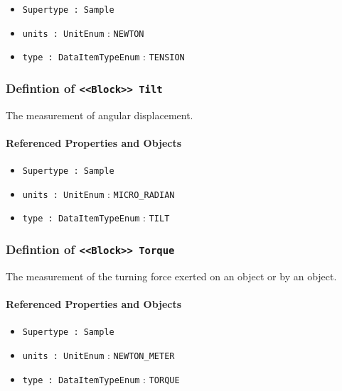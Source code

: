 \begin{itemize}
\item \texttt{Supertype : Sample}

\item \texttt{units : UnitEnum} : \texttt{NEWTON}

\item \texttt{type : DataItemTypeEnum} : \texttt{TENSION}

\end{itemize}
\FloatBarrier
\subsubsection{Defintion of \texttt{<<Block>> Tilt}}
  \label{type:Tilt}

\FloatBarrier

The measurement of angular displacement.

\FloatBarrier
\paragraph{Referenced Properties and Objects}

\begin{itemize}
\item \texttt{Supertype : Sample}

\item \texttt{units : UnitEnum} : \texttt{MICRO_RADIAN}

\item \texttt{type : DataItemTypeEnum} : \texttt{TILT}

\end{itemize}
\FloatBarrier
\subsubsection{Defintion of \texttt{<<Block>> Torque}}
  \label{type:Torque}

\FloatBarrier

The measurement of the turning force exerted on an object or by an object.

\FloatBarrier
\paragraph{Referenced Properties and Objects}

\begin{itemize}
\item \texttt{Supertype : Sample}

\item \texttt{units : UnitEnum} : \texttt{NEWTON_METER}

\item \texttt{type : DataItemTypeEnum} : \texttt{TORQUE}

\end{itemize}
\FloatBarrier
